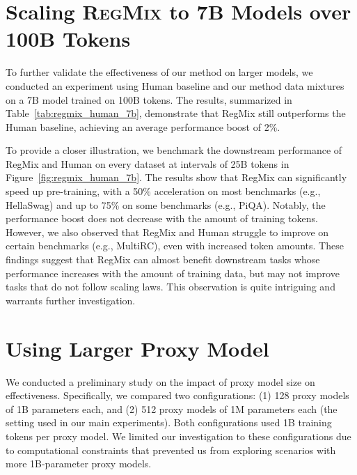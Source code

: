 \documentclass{article}
\theoremstyle{definition}
\theoremstyle{remark}
\newcommand{\ourmethod}{\textsc{RegMix}\xspace}
\begin{document}
\section{Scaling \ourmethod to 7B Models over 100B Tokens}

To further validate the effectiveness of our method on larger models, we conducted an experiment using Human baseline and our method data mixtures on a 7B model trained on 100B tokens. The results, summarized in Table~\ref{tab:regmix_human_7b}, demonstrate that RegMix still outperforms the Human baseline, achieving an average performance boost of 2\%.

To provide a closer illustration, we benchmark the downstream performance of RegMix and Human on every dataset at intervals of 25B tokens in Figure~\ref{fig:regmix_human_7b}. The results show that RegMix can significantly speed up pre-training, with a 50\% acceleration on most benchmarks (e.g., HellaSwag) and up to 75\% on some benchmarks (e.g., PiQA). Notably, the performance boost does not decrease with the amount of training tokens. However, we also observed that RegMix and Human struggle to improve on certain benchmarks (e.g., MultiRC), even with increased token amounts.
These findings suggest that RegMix can almost benefit downstream tasks whose performance increases with the amount of training data, but may not improve tasks that do not follow scaling laws. This observation is quite intriguing and warrants further investigation.

\section{Using Larger Proxy Model}

We conducted a preliminary study on the impact of proxy model size on effectiveness. Specifically, we compared two configurations: (1) 128 proxy models of 1B parameters each, and (2) 512 proxy models of 1M parameters each (the setting used in our main experiments). Both configurations used 1B training tokens per proxy model. We limited our investigation to these configurations due to computational constraints that prevented us from exploring scenarios with more 1B-parameter proxy models.
\end{document}
